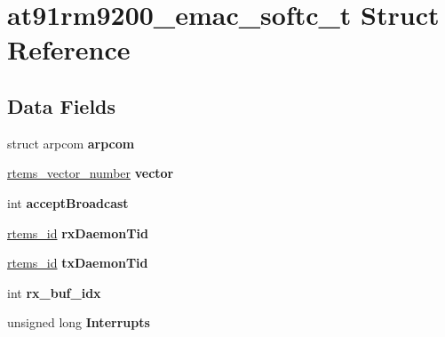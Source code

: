 \hypertarget{structat91rm9200__emac__softc__t}{}\section{at91rm9200\+\_\+emac\+\_\+softc\+\_\+t Struct Reference}
\label{structat91rm9200__emac__softc__t}
\subsection*{Data Fields}
\begin{DoxyCompactItemize}
\item 
\mbox{\label{structat91rm9200__emac__softc__t_a293a97e551e7733670cbd315adbf5f4e}} 
struct arpcom {\bfseries arpcom}
\item 
\mbox{\label{structat91rm9200__emac__softc__t_abc79193f379a7afc845edd1ea29526db}} 
\mbox{\hyperlink{group__ClassicINTR_ga3e434c197d99f128e78cae4d9358bd8b}{rtems\+\_\+vector\+\_\+number}} {\bfseries vector}
\item 
\mbox{\label{structat91rm9200__emac__softc__t_a869e76566e732512257508007c6eb7ff}} 
int {\bfseries accept\+Broadcast}
\item 
\mbox{\label{structat91rm9200__emac__softc__t_ab34c44d3be0d92151d21786517b39949}} 
\mbox{\hyperlink{group__ClassicTasks_gab20892b814dced7dd4e5b9bf42becd57}{rtems\+\_\+id}} {\bfseries rx\+Daemon\+Tid}
\item 
\mbox{\label{structat91rm9200__emac__softc__t_aeeee96e9b5ec4cb82a644fdbbeaa4547}} 
\mbox{\hyperlink{group__ClassicTasks_gab20892b814dced7dd4e5b9bf42becd57}{rtems\+\_\+id}} {\bfseries tx\+Daemon\+Tid}
\item 
\mbox{\label{structat91rm9200__emac__softc__t_a7fbbc8b13b00353475f4f9168dca69a5}} 
int {\bfseries rx\+\_\+buf\+\_\+idx}
\item 
\mbox{\label{structat91rm9200__emac__softc__t_a06e00c56edf51476f59032685c29350f}} 
unsigned long {\bfseries Interrupts}
\item 

\end{DoxyCompactItemize}
